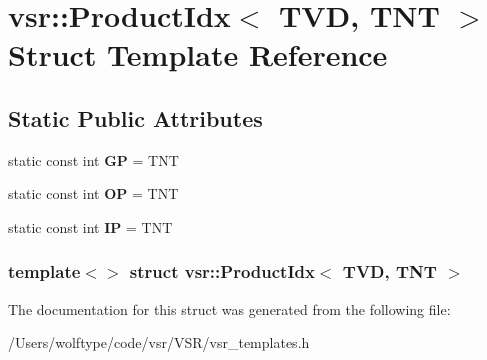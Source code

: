 \hypertarget{structvsr_1_1_product_idx_3_01_t_v_d_00_01_t_n_t_01_4}{\section{vsr\-:\-:Product\-Idx$<$ T\-V\-D, T\-N\-T $>$ Struct Template Reference}
\label{structvsr_1_1_product_idx_3_01_t_v_d_00_01_t_n_t_01_4}
}
\subsection*{Static Public Attributes}
\begin{DoxyCompactItemize}
\item 
\hypertarget{structvsr_1_1_product_idx_3_01_t_v_d_00_01_t_n_t_01_4_a7ac57595d533f80a63da68768987e1f0}{static const int {\bfseries G\-P} = T\-N\-T}\label{structvsr_1_1_product_idx_3_01_t_v_d_00_01_t_n_t_01_4_a7ac57595d533f80a63da68768987e1f0}

\item 
\hypertarget{structvsr_1_1_product_idx_3_01_t_v_d_00_01_t_n_t_01_4_ae0dfd7114389fd3a6d2720cab1bbd862}{static const int {\bfseries O\-P} = T\-N\-T}\label{structvsr_1_1_product_idx_3_01_t_v_d_00_01_t_n_t_01_4_ae0dfd7114389fd3a6d2720cab1bbd862}

\item 
\hypertarget{structvsr_1_1_product_idx_3_01_t_v_d_00_01_t_n_t_01_4_a088dbcb81a60e493d77eb80e033dc750}{static const int {\bfseries I\-P} = T\-N\-T}\label{structvsr_1_1_product_idx_3_01_t_v_d_00_01_t_n_t_01_4_a088dbcb81a60e493d77eb80e033dc750}

\end{DoxyCompactItemize}
\subsubsection*{template$<$$>$ struct vsr\-::\-Product\-Idx$<$ T\-V\-D, T\-N\-T $>$}



The documentation for this struct was generated from the following file\-:\begin{DoxyCompactItemize}
\item 
/\-Users/wolftype/code/vsr/\-V\-S\-R/vsr\-\_\-templates.\-h\end{DoxyCompactItemize}
